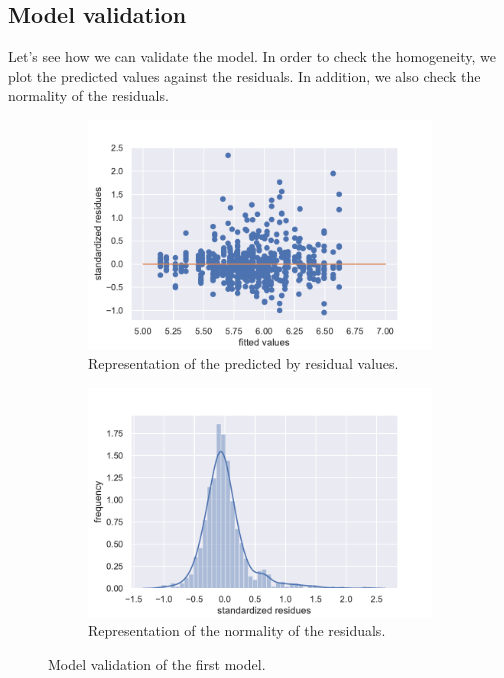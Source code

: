 \documentclass{article}
\begin{document}
\subsection{Model validation}
Let's see how we can validate the model. In order to check the homogeneity, we plot the predicted values against the residuals. In addition, we also check the normality of the residuals.
\begin{figure}[H]
\centering
\begin{subfigure}{.5\textwidth}
  \centering
  \includegraphics[width=1\linewidth]{./images/homo_mod1.pdf}
  \caption{Representation of the predicted by residual values.}
  \label{fig:homo_mod1}
\end{subfigure}%
\begin{subfigure}{.5\textwidth}
  \centering
  \includegraphics[width=1\linewidth, clip,trim={0cm 0cm 0cm 0.6cm} ]{./images/resid_norm.pdf}
  \caption{Representation of the normality of the residuals.}
  \label{fig:resid}
\end{subfigure}
\caption{Model validation of the first model.}
\label{fig:valid_1}
\end{figure}
\end{document}
